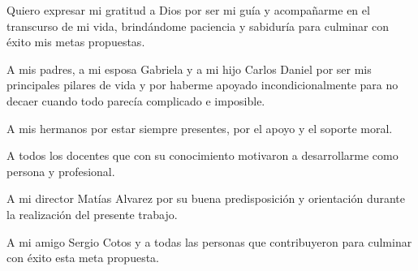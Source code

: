 \documentclass[
11pt, %
spanish,
singlespacing, %
parskip, %
headsepline, %
]{MastersDoctoralThesis} %
\begin{document}
\begin{acknowledgements}
\vspace{1.5cm}

Quiero expresar mi gratitud a Dios por ser mi guía y acompañarme en el transcurso de mi vida, brindándome paciencia y sabiduría para culminar con éxito mis metas propuestas.

A mis padres, a mi esposa Gabriela y a mi hijo Carlos Daniel por ser mis principales pilares de vida y por haberme apoyado incondicionalmente para no decaer cuando todo parecía complicado e imposible.

A mis hermanos por estar siempre presentes, por el apoyo y el soporte moral.

A todos los docentes que con su conocimiento motivaron a desarrollarme como persona y profesional.

A mi director Matías Alvarez por su buena predisposición y orientación durante la realización del presente trabajo.

A mi amigo Sergio Cotos y a todas las personas que contribuyeron para culminar con éxito esta meta propuesta.
 

\end{acknowledgements}


\tableofcontents %

\listoffigures %

\listoftables %





\mainmatter %
\end{document}
